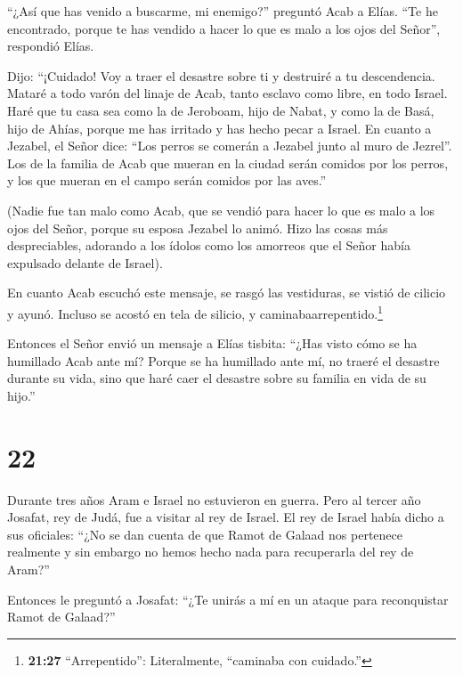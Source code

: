  ``¿Así que has venido a buscarme, mi enemigo?'' preguntó
Acab a Elías. ``Te he encontrado, porque te has vendido a hacer lo que
es malo a los ojos del Señor'', respondió Elías.

 Dijo: ``¡Cuidado! Voy a traer el desastre sobre ti y
destruiré a tu descendencia. Mataré a todo varón del linaje de Acab,
tanto esclavo como libre, en todo Israel.  Haré que tu casa
sea como la de Jeroboam, hijo de Nabat, y como la de Basá, hijo de
Ahías, porque me has irritado y has hecho pecar a Israel. 
En cuanto a Jezabel, el Señor dice: ``Los perros se comerán a Jezabel
junto al muro de Jezrel''.  Los de la familia de Acab que
mueran en la ciudad serán comidos por los perros, y los que mueran en el
campo serán comidos por las aves.''

 (Nadie fue tan malo como Acab, que se vendió para hacer lo
que es malo a los ojos del Señor, porque su esposa Jezabel lo animó.
 Hizo las cosas más despreciables, adorando a los ídolos
como los amorreos que el Señor había expulsado delante de Israel).

 En cuanto Acab escuchó este mensaje, se rasgó las
vestiduras, se vistió de cilicio y ayunó. Incluso se acostó en tela de
silicio, y caminabaarrepentido.\footnote{\textbf{21:27} ``Arrepentido'':
  Literalmente, ``caminaba con cuidado.''}

 Entonces el Señor envió un mensaje a Elías tisbita:
 ``¿Has visto cómo se ha humillado Acab ante mí? Porque se
ha humillado ante mí, no traeré el desastre durante su vida, sino que
haré caer el desastre sobre su familia en vida de su hijo.''

\hypertarget{section-21}{%
\section{22}\label{section-21}}

 Durante tres años Aram e Israel no estuvieron en guerra.
 Pero al tercer año Josafat, rey de Judá, fue a visitar al
rey de Israel.  El rey de Israel había dicho a sus
oficiales: ``¿No se dan cuenta de que Ramot de Galaad nos pertenece
realmente y sin embargo no hemos hecho nada para recuperarla del rey de
Aram?''

 Entonces le preguntó a Josafat: ``¿Te unirás a mí en un
ataque para reconquistar Ramot de Galaad?''

